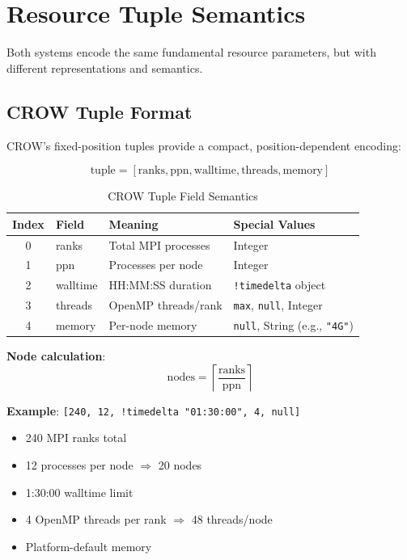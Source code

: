 \documentclass[11pt,twoside]{article}
\newcommand{\crow}{\textsc{CROW}}
\begin{document}
\section{Resource Tuple Semantics}
\label{sec:semantics}

Both systems encode the same fundamental resource parameters, but with different representations and semantics.

\subsection{CROW Tuple Format}

\crow{}'s fixed-position tuples provide a compact, position-dependent encoding:

\begin{equation}
\text{tuple} = [\text{ranks}, \text{ppn}, \text{walltime}, \text{threads}, \text{memory}]
\end{equation}

\begin{table}[H]
\centering
\caption{\crow{} Tuple Field Semantics}
\label{tab:crow-tuple}
\begin{tabular}{@{}clp{6cm}l@{}}
\toprule
\textbf{Index} & \textbf{Field} & \textbf{Meaning} & \textbf{Special Values} \\
\midrule
0 & ranks & Total MPI processes & Integer \\
1 & ppn & Processes per node & Integer \\
2 & walltime & HH:MM:SS duration & \texttt{!timedelta} object \\
3 & threads & OpenMP threads/rank & \texttt{max}, \texttt{null}, Integer \\
4 & memory & Per-node memory & \texttt{null}, String (e.g., \texttt{"4G"}) \\
\bottomrule
\end{tabular}
\end{table}

\textbf{Node calculation}:
\begin{equation}
\text{nodes} = \left\lceil \frac{\text{ranks}}{\text{ppn}} \right\rceil
\end{equation}

\textbf{Example}: \texttt{[240, 12, !timedelta "01:30:00", 4, null]}
\begin{itemize}[leftmargin=2em]
    \item 240 MPI ranks total
    \item 12 processes per node $\Rightarrow$ 20 nodes
    \item 1:30:00 walltime limit
    \item 4 OpenMP threads per rank $\Rightarrow$ 48 threads/node
    \item Platform-default memory
\end{itemize}
\end{document}
